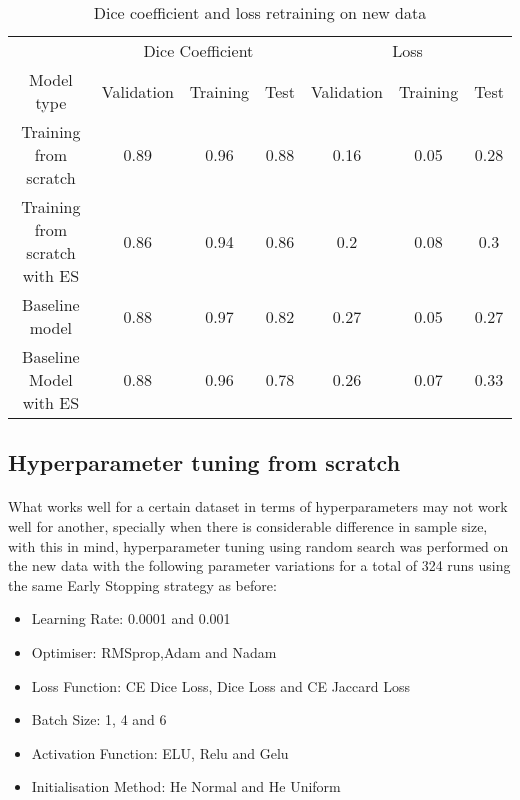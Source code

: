 \begin{table}[ht] 
    \begin{center}
    \begin{tabular}{ccccccc} 
    \toprule
       & \multicolumn{3}{c}{Dice Coefficient}     & \multicolumn{3}{c}{Loss} \\
    Model type & Validation & Training & Test & Validation    & Training    & Test   \\ \midrule
    \rowcolor{lightgray}
    Training from scratch & 0.89 & 0.96 & 0.88 & 0.16 & 0.05 & 0.28  \\ Training from scratch with ES & 0.86 & 0.94 & 0.86 & 0.2 & 0.08 & 0.3  \\ Baseline model & 0.88 & 0.97 & 0.82 & 0.27 & 0.05 & 0.27  \\ Baseline Model with ES & 0.88 & 0.96 & 0.78 & 0.26 & 0.07 & 0.33  \\
    \bottomrule
    \end{tabular}
  \end{center} 
  \caption{Dice coefficient and loss retraining on new data}\label{tab_fs}
\end{table}

\subsection{Hyperparameter tuning from scratch}
\paragraph{}
What works well for a certain dataset in terms of hyperparameters may not work well for another, specially when there is considerable difference in sample size, with this in mind,  hyperparameter tuning using random search was performed on the new data with the following parameter variations for a total of 324 runs using the same Early Stopping strategy as before:

\begin{itemize}
    \item{Learning Rate: 0.0001 and 0.001}
    \item{Optimiser: RMSprop,Adam and Nadam}
    \item{Loss Function: CE Dice Loss, Dice Loss and CE Jaccard Loss}
    \item{Batch Size: 1, 4 and 6}
    \item{Activation Function: ELU, Relu and Gelu}
    \item{Initialisation Method: He Normal and He Uniform}
\end{itemize}

